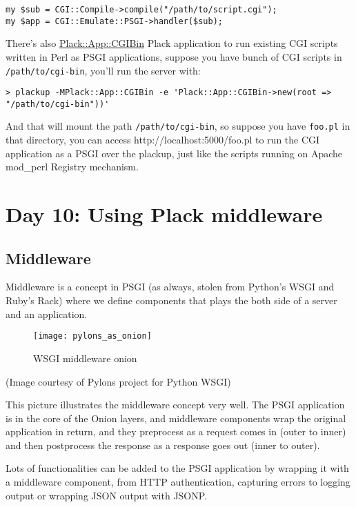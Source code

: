 \begin{lstlisting}
my $sub = CGI::Compile->compile("/path/to/script.cgi");
my $app = CGI::Emulate::PSGI->handler($sub);
\end{lstlisting}

There's also
\href{http://search.cpan.org/perldoc?Plack::App::CGIBin}{Plack::App::CGIBin}
Plack application to run existing CGI scripts written in Perl as PSGI
applications, suppose you have bunch of CGI scripts in
\lstinline!/path/to/cgi-bin!, you'll run the server with:

\begin{lstlisting}
> plackup -MPlack::App::CGIBin -e 'Plack::App::CGIBin->new(root => "/path/to/cgi-bin"))'
\end{lstlisting}

And that will mount the path \lstinline!/path/to/cgi-bin!, so suppose
you have \lstinline!foo.pl! in that directory, you can access
http://localhost:5000/foo.pl to run the CGI application as a PSGI over
the plackup, just like the scripts running on Apache mod\_perl Registry
mechanism.

\chapter{Day 10: Using Plack
middleware}\label{day-10-using-plack-middleware}

\section{Middleware}\label{middleware}

Middleware is a concept in PSGI (as always, stolen from Python's WSGI
and Ruby's Rack) where we define components that plays the both side of
a server and an application.

\begin{figure}[htbp]
\centering
\texttt{[image: pylons\_as\_onion]}
\caption{WSGI middleware onion}
\end{figure}

(Image courtesy of Pylons project for Python WSGI)

This picture illustrates the middleware concept very well. The PSGI
application is in the core of the Onion layers, and middleware
components wrap the original application in return, and they preprocess
as a request comes in (outer to inner) and then postprocess the response
as a response goes out (inner to outer).

Lots of functionalities can be added to the PSGI application by wrapping
it with a middleware component, from HTTP authentication, capturing
errors to logging output or wrapping JSON output with JSONP.

